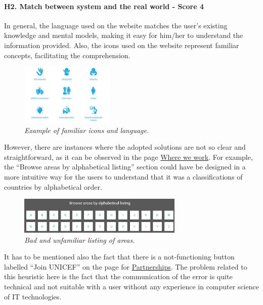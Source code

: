 \paragraph{H2. Match between system and the real world - Score 4} \label{subsec:H2}	In general, the language used on the website matches the user’s existing knowledge and mental models, making it easy for him/her to understand the information provided. Also, the icons used on the website represent familiar concepts, facilitating the comprehension.
\begin{figure}[!h]
	\begin{center}
		\includegraphics[width=0.4\textwidth]{FinalScores4.jpg}
		\captionsetup{font=small}
		\caption{\textit{Example of familiar icons and language.}}
	\end{center}
\end{figure}
\newline However, there are instances where the adopted solutions are not so clear and straightforward, as it can be observed in the page \href{https://www.unicef.org/where-we-work}{Where we work}. For example, the “Browse areas by alphabetical listing” section could have be designed in a more intuitive way for the users to understand that it was a classifications of countries by alphabetical order.
\begin{figure}[!h]
	\begin{center}
		\includegraphics[width=0.7\textwidth]{FinalScores5.jpg}
		\captionsetup{font=small}
		\caption{\textit{Bad and unfamiliar listing of areas.}}
	\end{center}
\end{figure}
\newline
\newline
It has to be mentioned also the fact that there is a not-functioning button labelled “Join UNICEF” on the page for  \href{https://www.unicef.org/partnerships}{Partnerships}. The problem related to this heuristic here is the fact that the communication of the error is quite technical and not suitable with a user without any experience in computer science of IT technologies.












